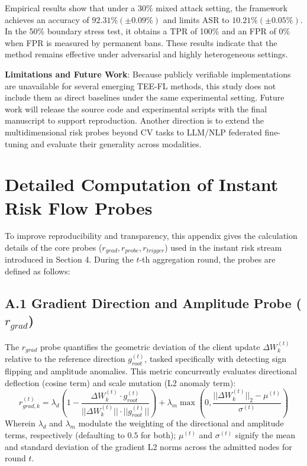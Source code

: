 \documentclass[runningheads,orivec]{llncs}
\begin{document}
Empirical results show that under a 30\% mixed attack setting, the framework achieves an accuracy of $92.31\% (\pm 0.09\%)$ and limits ASR to $10.21\% (\pm 0.05\%)$. In the 50\% boundary stress test, it obtains a TPR of 100\% and an FPR of 0\% when FPR is measured by permanent bans. These results indicate that the method remains effective under adversarial and highly heterogeneous settings.

\textbf{Limitations and Future Work}: Because publicly verifiable implementations are unavailable for several emerging TEE-FL methods, this study does not include them as direct baselines under the same experimental setting. Future work will release the source code and experimental scripts with the final manuscript to support reproduction. Another direction is to extend the multidimensional risk probes beyond CV tasks to LLM/NLP federated fine-tuning and evaluate their generality across modalities.

\appendix
\section{Detailed Computation of Instant Risk Flow Probes}
To improve reproducibility and transparency, this appendix gives the calculation details of the core probes ($r_{grad}, r_{probe}, r_{trigger}$) used in the instant risk stream introduced in Section 4. During the $t$-th aggregation round, the probes are defined as follows:

\subsection{A.1 Gradient Direction and Amplitude Probe \texorpdfstring{($r_{grad}$)}{(r-grad)}}
The $r_{grad}$ probe quantifies the geometric deviation of the client update $\Delta W_k^{(t)}$ relative to the reference direction $g_{root}^{(t)}$, tasked specifically with detecting sign flipping and amplitude anomalies. This metric concurrently evaluates directional deflection (cosine term) and scale mutation (L2 anomaly term):
\begin{equation}
    r_{grad, k}^{(t)} = \lambda_{d} \left(1 - \frac{\Delta W_k^{(t)} \cdot g_{root}^{(t)}}{||\Delta W_k^{(t)}|| \cdot ||g_{root}^{(t)}||}\right) + \lambda_{m} \max\left(0, \frac{||\Delta W_k^{(t)}||_2 - \mu^{(t)}}{\sigma^{(t)}}\right)
\end{equation}
Wherein $\lambda_d$ and $\lambda_m$ modulate the weighting of the directional and amplitude terms, respectively (defaulting to $0.5$ for both); $\mu^{(t)}$ and $\sigma^{(t)}$ signify the mean and standard deviation of the gradient L2 norms across the admitted nodes for round $t$.
\end{document}
